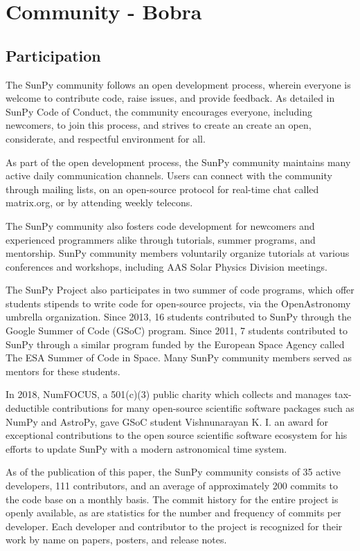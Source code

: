 \section{Community - Bobra}
\label{sec:community}


\subsection{Participation}
The SunPy community follows an open development process, wherein everyone is welcome to contribute code, raise issues, and provide feedback. As detailed in SunPy Code of Conduct, the community encourages everyone, including newcomers, to join this process, and strives to create an create an open, considerate, and respectful environment for all. 

As part of the open development process, the SunPy community maintains many active daily communication channels. Users can connect with the community through mailing lists, on an open-source protocol for real-time chat called matrix.org, or by attending weekly telecons.

The SunPy community also fosters code development for newcomers and experienced programmers alike through tutorials, summer programs, and mentorship. SunPy community members voluntarily organize tutorials at various conferences and workshops, including AAS Solar Physics Division meetings. 

The SunPy Project also participates in two summer of code programs, which offer students stipends to write code for open-source projects, via the OpenAstronomy umbrella organization. Since 2013, 16 students contributed to SunPy through the Google Summer of Code (GSoC) program. Since 2011, 7 students contributed to SunPy through a similar program funded by the European Space Agency called The ESA Summer of Code in Space. Many SunPy community members served as mentors for these students. 

In 2018, NumFOCUS, a 501(c)(3) public charity which collects and manages tax-deductible contributions for many open-source scientific software packages such as NumPy and AstroPy, gave GSoC student Vishnunarayan K. I. an award for exceptional contributions to the open source scientific software ecosystem for his efforts to update SunPy with a modern astronomical time system.

As of the publication of this paper, the SunPy community consists of 35 active developers, 111 contributors, and an average of approximately 200 commits to the code base on a monthly basis. The commit history for the entire project is openly available, as are statistics for the number and frequency of commits per developer. Each developer and contributor to the \sunpy project is recognized for their work by name on papers, posters, and release notes.
